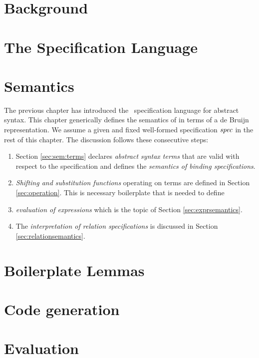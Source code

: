 
\chapter{Background}



\chapter{The \Knot Specification Language}\label{ch:knotsyntax}


\chapter{Semantics}\label{ch:knotsemantics}

The previous chapter has introduced the \Knot~specification language for
abstract syntax. This chapter generically defines the semantics of \Knot in
terms of a de Bruijn representation. We assume a given and fixed well-formed
specification $\mathit{spec}$ in the rest of this chapter. The discussion follows these
consecutive steps:

\begin{enumerate}
\item Section \ref{sec:sem:terms} declares \emph{abstract syntax terms} that are
  valid with respect to the specification and defines the \emph{semantics of
    binding specifications}.
\item \emph{Shifting and substitution functions} operating on terms are defined
  in Section \ref{sec:operation}. This is necessary boilerplate that is needed
  to define
\item \emph{evaluation of expressions} which is the topic of Section
  \ref{sec:exprsemantics}.
\item The \emph{interpretation of relation specifications} is discussed in
  Section \ref{sec:relationsemantics}.
\end{enumerate}





\chapter{Boilerplate Lemmas}\label{ch:elaboration}




\chapter{Code generation}\label{ch:codegen}


\chapter{Evaluation}






